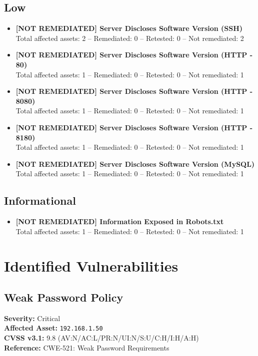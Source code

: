 \documentclass[a4paper,12pt]{article}
\begin{document}
\subsection*{\color{NavyBlue}Low}
\begin{itemize}
    \item \textbf{[NOT REMEDIATED] Server Discloses Software Version (SSH)} \\
    Total affected assets: 2 -- Remediated: 0 -- Retested: 0 -- Not remediated: 2
    \item \textbf{[NOT REMEDIATED] Server Discloses Software Version (HTTP - 80)} \\
    Total affected assets: 1 -- Remediated: 0 -- Retested: 0 -- Not remediated: 1
    \item \textbf{[NOT REMEDIATED] Server Discloses Software Version (HTTP - 8080)} \\
    Total affected assets: 1 -- Remediated: 0 -- Retested: 0 -- Not remediated: 1
    \item \textbf{[NOT REMEDIATED] Server Discloses Software Version (HTTP - 8180)} \\
    Total affected assets: 1 -- Remediated: 0 -- Retested: 0 -- Not remediated: 1
    \item \textbf{[NOT REMEDIATED] Server Discloses Software Version (MySQL)} \\
    Total affected assets: 1 -- Remediated: 0 -- Retested: 0 -- Not remediated: 1
\end{itemize}

\subsection*{\color{Periwinkle}Informational}
\begin{itemize}
    \item \textbf{[NOT REMEDIATED] Information Exposed in Robots.txt} \\
    Total affected assets: 1 -- Remediated: 0 -- Retested: 0 -- Not remediated: 1
\end{itemize}

\clearpage

\section{Identified Vulnerabilities}

\subsection{Weak Password Policy}
\textbf{Severity:} \textcolor{BrickRed}{Critical} \\
\textbf{Affected Asset:} \texttt{192.168.1.50} \\
\textbf{CVSS v3.1:} 9.8 (AV:N/AC:L/PR:N/UI:N/S:U/C:H/I:H/A:H) \\
\textbf{Reference:} CWE-521: Weak Password Requirements
\end{document}
